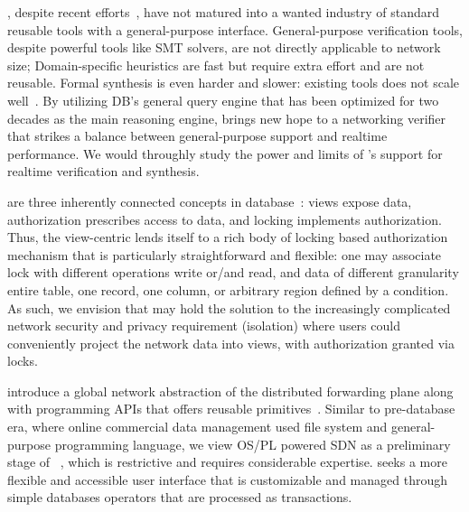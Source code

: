 \vspace{-.5em}
\label{sec:related}

, despite recent
efforts~\cite{veriflow,NetPlumber,network-verification-in-light-of-pv,dnv},
have not matured into a wanted industry of standard reusable tools
with a general-purpose interface.  General-purpose verification tools,
despite powerful tools like SMT solvers, are not directly applicable
to network size; Domain-specific heuristics are fast but require extra
effort and are not reusable.  Formal synthesis is even harder and
slower: existing tools does not scale
well~\cite{reactive-synthesis-sdn}. By utilizing DB's general query
engine that has been optimized for two decades as the main reasoning
engine, \Sys brings new hope to a networking verifier that strikes a
balance between general-purpose support and realtime performance.  We
would throughly study the power and limits of \Sys's support for
realtime verification and synthesis.

 are three inherently
connected concepts in database~\cite{Views-Authorization-and-Locking}:
views expose data, authorization prescribes access to data, and
locking implements authorization. Thus, the view-centric \Sys lends
itself to a rich body of locking based authorization mechanism that is
particularly straightforward and flexible: one may associate lock with
different operations \eg write or/and read, and data of different
granularity \eg entire table, one record, one column, or arbitrary
region defined by a condition.  As such, we envision that \Sys may
hold the solution to the increasingly complicated network security and
privacy requirement (\eg isolation) where users could conveniently
project the network data into views, with authorization granted via
locks.

introduce a global network abstraction of the distributed forwarding
plane along with programming APIs that offers reusable
primitives~\cite{onix,nox,composing,sdn-lang-frenetic}. Similar to
pre-database era, where online commercial data management used file
system and general-purpose programming language, we view OS/PL powered
SDN as a preliminary stage of
\Sys~\cite{Date:1971:file-and-data-independence,Cardelli:1985:PL-data-abstraction},
which is restrictive and requires considerable expertise.  \Sys seeks
a more flexible and accessible user interface that is customizable and
managed through simple databases operators that are processed as
transactions.

